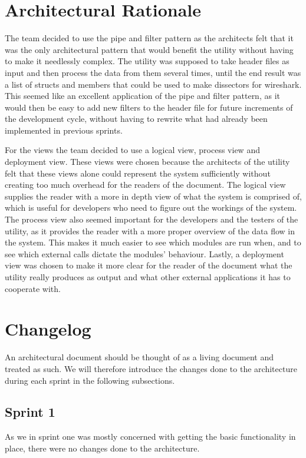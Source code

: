 \section{Architectural Rationale}
The team decided to use the pipe and filter pattern as the architects felt that it was the only architectural pattern that would benefit the \gls{utility} without having to make it needlessly complex. The \gls{utility} was supposed to take \gls{header} files as input and then process the data from them several times, until the end result was a list of \glspl{struct} and \glspl{member} that could be used to make \glspl{dissector} for \Gls{wireshark}. This seemed like an excellent application of the pipe and filter pattern, as it would then be easy to add new filters to the \gls{header} file for future increments of the development cycle, without having to rewrite what had already been implemented in previous sprints.

For the views the team decided to use a logical view, process view and deployment view. These views were chosen because the architects of the \gls{utility} felt that these views alone could represent the system sufficiently without creating too much overhead for the readers of the document. The logical view supplies the reader with a more in depth view of what the system is comprised of, which is useful for developers who need to figure out the workings of the system. The process view also seemed important for the developers and the testers of the \gls{utility}, as it provides the reader with a more proper overview of the data flow in the system. This makes it much easier to see which modules are run when, and to see which external calls dictate the modules' behaviour. Lastly, a deployment view was chosen to make it more clear for the reader of the document what the \gls{utility} really produces as output and what other external applications it has to cooperate with. 

\section{Changelog}
 An architectural document should be thought of as a living document and treated as such. We will therefore introduce the changes done to the architecture during each sprint in the following subsections.

\subsection{Sprint 1}
As we in sprint one was mostly concerned with getting the basic functionality in place, there were no changes done to the architecture.

